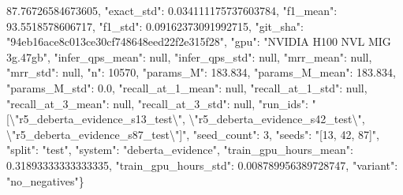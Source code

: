 87.76726584673605, "exact\_std": 0.034111175737603784, "f1\_mean": 93.5518578606717, "f1\_std": 0.09162373091992715, "git\_sha": "94eb16ace8c013ce30cf748648eed22f2e315f28", "gpu": "NVIDIA H100 NVL MIG 3g.47gb", "infer\_qps\_mean": null, "infer\_qps\_std": null, "mrr\_mean": null, "mrr\_std": null, "n": 10570, "params\_M": 183.834, "params\_M\_mean": 183.834, "params\_M\_std": 0.0, "recall\_at\_1\_mean": null, "recall\_at\_1\_std": null, "recall\_at\_3\_mean": null, "recall\_at\_3\_std": null, "run\_ids": "[\textbackslash{}"r5\_deberta\_evidence\_s13\_test\textbackslash{}", \textbackslash{}"r5\_deberta\_evidence\_s42\_test\textbackslash{}", \textbackslash{}"r5\_deberta\_evidence\_s87\_test\textbackslash{}"]", "seed\_count": 3, "seeds": "[13, 42, 87]", "split": "test", "system": "deberta\_evidence", "train\_gpu\_hours\_mean": 0.31893333333333335, "train\_gpu\_hours\_std": 0.008789956389728747, "variant": "no\_negatives"\}
